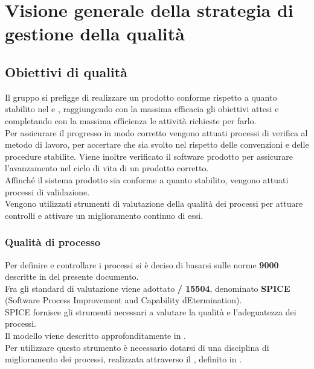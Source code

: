 \section{Visione generale della strategia di gestione della qualità}
\subsection{Obiettivi di qualità}
Il gruppo si prefigge di realizzare un prodotto conforme rispetto a quanto stabilito nel \PianoDiQualifica{} e \AnalisiDeiRequisiti{}, raggiungendo con la massima efficacia gli obiettivi attesi e completando con la massima efficienza le attività richieste per farlo.\\
Per assicurare il progresso in modo corretto vengono attuati processi di verifica al metodo di lavoro, per accertare che sia svolto nel rispetto delle convenzioni e delle procedure stabilite. Viene inoltre verificato il software prodotto per assicurare l'avanzamento nel ciclo di vita di un prodotto corretto.\\
Affinché il sistema prodotto sia conforme a quanto stabilito, vengono attuati processi di validazione.\\
Vengono utilizzati strumenti di valutazione della qualità dei processi per attuare controlli e attivare un miglioramento continuo di essi.

\subsubsection{Qualità di processo}
Per definire e controllare i processi si è deciso di basarsi sulle norme \textbf{ 9000} descritte in  del presente documento.\\
Fra gli standard di valutazione viene adottato \textbf{/ 15504}, denominato \textbf{SPICE} (Software Process Improvement and Capability dEtermination).\\
SPICE fornisce gli strumenti necessari a valutare la qualità e l'adeguatezza dei processi.\\
Il modello viene descritto approfonditamente in .\\
Per utilizzare questo strumento è necessario dotarsi di una disciplina di miglioramento dei processi, realizzata attraverso il , definito in .

